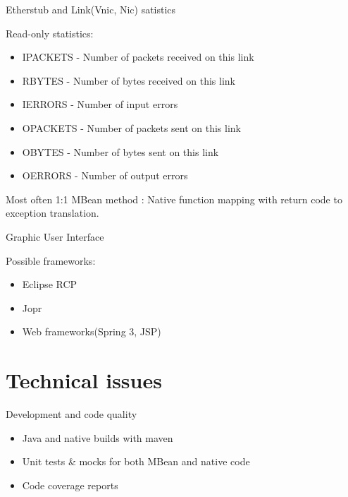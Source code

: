 \documentclass{beamer}
\begin{document}
		\begin{frame}{Etherstub and Link(Vnic, Nic) satistics }

			Read-only statistics:
			
			\begin{itemize}

				\item IPACKETS - Number of packets received on this link
				\item RBYTES - Number of bytes received on this link
				\item IERRORS - Number of input errors
				\item OPACKETS - Number of packets sent on this link
				\item OBYTES - Number of bytes sent on this link
				\item OERRORS - Number of output errors
			
			\end{itemize}

			Most often 1:1 MBean method : Native function mapping with return code to exception translation.

		\end{frame}

		\begin{frame}{Graphic User Interface}

			\begin{center}
				Possible frameworks:
				\begin{itemize}
					\item Eclipse RCP
					\item Jopr
					\item Web frameworks(Spring 3, JSP)
				
				\end{itemize}
			\end{center}
		\end{frame}


\section{Technical issues}

	\begin{frame}{Development and code quality}

		\begin{itemize}
			\item Java and native builds with maven
			\item Unit tests \& mocks for both MBean and native code
			\item Code coverage reports
		\end{itemize}
	
	\end{frame}
\end{document}
